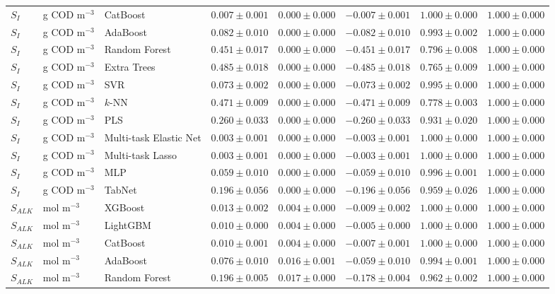 \begin{longtable}{llp{3.1cm}rrrrr}
$S_{I}$ & g COD m$^{-3}$ & CatBoost & $0.007\pm0.001$ & $0.000\pm0.000$ & $-0.007\pm0.001$ & $1.000\pm0.000$ & $1.000\pm0.000$ \\
$S_{I}$ & g COD m$^{-3}$ & AdaBoost & $0.082\pm0.010$ & $0.000\pm0.000$ & $-0.082\pm0.010$ & $0.993\pm0.002$ & $1.000\pm0.000$ \\
$S_{I}$ & g COD m$^{-3}$ & Random Forest & $0.451\pm0.017$ & $0.000\pm0.000$ & $-0.451\pm0.017$ & $0.796\pm0.008$ & $1.000\pm0.000$ \\
$S_{I}$ & g COD m$^{-3}$ & Extra Trees & $0.485\pm0.018$ & $0.000\pm0.000$ & $-0.485\pm0.018$ & $0.765\pm0.009$ & $1.000\pm0.000$ \\
$S_{I}$ & g COD m$^{-3}$ & SVR & $0.073\pm0.002$ & $0.000\pm0.000$ & $-0.073\pm0.002$ & $0.995\pm0.000$ & $1.000\pm0.000$ \\
$S_{I}$ & g COD m$^{-3}$ & $k$-NN & $0.471\pm0.009$ & $0.000\pm0.000$ & $-0.471\pm0.009$ & $0.778\pm0.003$ & $1.000\pm0.000$ \\
$S_{I}$ & g COD m$^{-3}$ & PLS & $0.260\pm0.033$ & $0.000\pm0.000$ & $-0.260\pm0.033$ & $0.931\pm0.020$ & $1.000\pm0.000$ \\
$S_{I}$ & g COD m$^{-3}$ & Multi-task Elastic Net & $0.003\pm0.001$ & $0.000\pm0.000$ & $-0.003\pm0.001$ & $1.000\pm0.000$ & $1.000\pm0.000$ \\
$S_{I}$ & g COD m$^{-3}$ & Multi-task Lasso & $0.003\pm0.001$ & $0.000\pm0.000$ & $-0.003\pm0.001$ & $1.000\pm0.000$ & $1.000\pm0.000$ \\
$S_{I}$ & g COD m$^{-3}$ & MLP & $0.059\pm0.010$ & $0.000\pm0.000$ & $-0.059\pm0.010$ & $0.996\pm0.001$ & $1.000\pm0.000$ \\
$S_{I}$ & g COD m$^{-3}$ & TabNet & $0.196\pm0.056$ & $0.000\pm0.000$ & $-0.196\pm0.056$ & $0.959\pm0.026$ & $1.000\pm0.000$ \\
$S_{ALK}$ & mol m$^{-3}$ & XGBoost & $0.013\pm0.002$ & $0.004\pm0.000$ & $-0.009\pm0.002$ & $1.000\pm0.000$ & $1.000\pm0.000$ \\
$S_{ALK}$ & mol m$^{-3}$ & LightGBM & $0.010\pm0.000$ & $0.004\pm0.000$ & $-0.005\pm0.000$ & $1.000\pm0.000$ & $1.000\pm0.000$ \\
$S_{ALK}$ & mol m$^{-3}$ & CatBoost & $0.010\pm0.001$ & $0.004\pm0.000$ & $-0.007\pm0.001$ & $1.000\pm0.000$ & $1.000\pm0.000$ \\
$S_{ALK}$ & mol m$^{-3}$ & AdaBoost & $0.076\pm0.010$ & $0.016\pm0.001$ & $-0.059\pm0.010$ & $0.994\pm0.001$ & $1.000\pm0.000$ \\
$S_{ALK}$ & mol m$^{-3}$ & Random Forest & $0.196\pm0.005$ & $0.017\pm0.000$ & $-0.178\pm0.004$ & $0.962\pm0.002$ & $1.000\pm0.000$ \\

\end{longtable}
